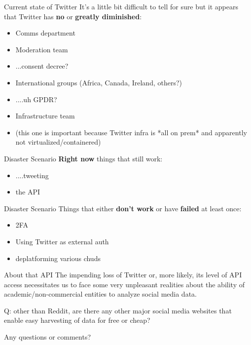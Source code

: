 \documentclass{beamer}
\begin{document}
\begin{frame}{Current state of Twitter}
	It's a little bit difficult to tell for sure but it appears that Twitter has \textbf{no} or \textbf{greatly diminished}:
	\begin{itemize}
		\pause
		\item Comms department
		\pause
		\item Moderation team
		\pause
		\item ...consent decree?
		\pause
		\item International groups (Africa, Canada, Ireland, others?)
		\pause
		\item ....uh GPDR? 
		\pause 
		\item Infrastructure team 
		\pause
		\item (this one is important because Twitter infra is *all on prem* and apparently not virtualized/containered)
	\end{itemize}
\end{frame}

\begin{frame}{Disaster Scenario}
	\textbf{Right now} things that still work:
	\begin{itemize}
		\pause
		\item ....tweeting
		\pause
		\item the API
		\pause
	\end{itemize}
\end{frame}

\begin{frame}{Disaster Scenario}
	Things that either \textbf{don't work} or have \textbf{failed} at least once:
	\begin{itemize}
		\pause
		\item 2FA
		\pause
		\item Using Twitter as external auth
		\pause
		\item deplatforming various chuds
	\end{itemize}
\end{frame}

\begin{frame}{About that API}
	The impending loss of Twitter or, more likely, its level of API access necessitates us to face some very unpleasant realities about the ability of academic/non-commercial entities to analyze social media data.
	
	Q: other than Reddit, are there any other major social media websites that enable easy harvesting of data for free or cheap?
\end{frame}

\begin{frame}
	Any questions or comments?
\end{frame}
\end{document}
